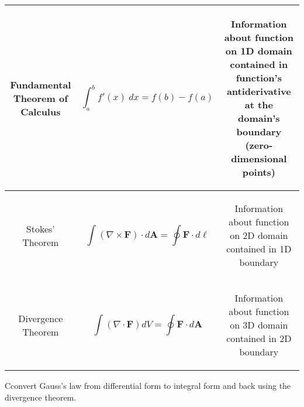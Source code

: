 \documentclass{article}
\begin{document}
\begin{table}[H]
\centering
{}
\begin{tabular}{@{}c|c|c@{}}
\toprule
\parbox[c]{0.3\textwidth}{\begin{center}Fundamental Theorem of Calculus\end{center}} & \parbox[c]{0.3\textwidth}{\begin{equation*} \int_a^b f'(x)\ dx = f(b) - f(a) \end{equation*}} & \parbox[c]{0.3\textwidth}{\begin{center} Information about function on 1D domain contained in function's antiderivative at the domain's boundary (zero-dimensional points) \end{center}} \\ \midrule
\parbox[c]{0.3\textwidth}{\begin{center}Stokes' Theorem\end{center}} & \parbox[c]{0.3\textwidth}{\begin{equation*} \int \left( \nabla \times \bm{F} \right) \cdot d\bm{A} = \oint \bm{F} \cdot d\bm{\ell} \end{equation*}} & \parbox[c]{0.3\textwidth}{\begin{center} Information about function on 2D domain contained in 1D boundary \end{center}} \\ \midrule
\parbox[c]{0.3\textwidth}{\begin{center}Divergence Theorem\end{center}} & \parbox[c]{0.3\textwidth}{\begin{equation*} \int \left( \nabla \cdot \bm{F} \right) dV = \oint \bm{F} \cdot d\bm{A} \end{equation*}} & \parbox[c]{0.3\textwidth}{\begin{center} Information about function on 3D domain contained in 2D boundary \end{center}} \\ \bottomrule
\end{tabular}
\end{table}

\begin{mdframed}[backgroundcolor=black!4, align=center, userdefinedwidth=0.8\textwidth, topline=false, bottomline = false, leftline = false, rightline = false, frametitle = {Group Activity}]

Cconvert Gauss's law from differential form to integral form and back using the divergence theorem.

\end{mdframed}
\end{document}

